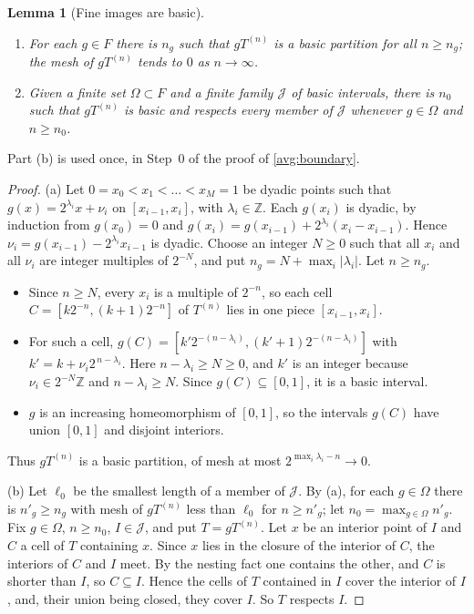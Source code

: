 \documentclass[11pt]{article}
\newcommand{\Z}{\mathbb Z}
\newtheorem{lemma}[theorem]{Lemma}
\theoremstyle{definition}
\numberwithin{equation}{section}
\begin{document}
\begin{lemma}[Fine images are basic]\label{dyad:eventual}
\begin{enumerate}[label=(\alph*)]
\item For each \(g\in F\) there is \(n_g\) such that \(gT^{(n)}\) is a basic
partition for all \(n\ge n_g\); the mesh of \(gT^{(n)}\) tends to \(0\) as
\(n\to\infty\).
\item Given a finite set \(\Omega\subset F\) and a finite family
\(\mathcal J\) of basic intervals, there is \(n_0\) such that \(gT^{(n)}\) is
basic and respects every member of \(\mathcal J\) whenever \(g\in\Omega\) and
\(n\ge n_0\).
\end{enumerate}
\end{lemma}
Part (b) is used once, in Step~0 of the proof of \cref{avg:boundary}.

\begin{proof}
(a) Let \(0=x_0<x_1<\dots<x_M=1\) be dyadic points such that
\(g(x)=2^{\lambda_i}x+\nu_i\) on \([x_{i-1},x_i]\), with \(\lambda_i\in\Z\).
Each \(g(x_i)\) is dyadic, by induction from \(g(x_0)=0\) and
\(g(x_i)=g(x_{i-1})+2^{\lambda_i}(x_i-x_{i-1})\). Hence
\(\nu_i=g(x_{i-1})-2^{\lambda_i}x_{i-1}\) is dyadic. Choose an integer
\(N\ge0\) such that all \(x_i\) and all \(\nu_i\) are integer multiples of
\(2^{-N}\), and put \(n_g=N+\max_i|\lambda_i|\). Let \(n\ge n_g\).
\begin{itemize}
\item Since \(n\ge N\), every \(x_i\) is a multiple of \(2^{-n}\), so each
cell \(C=[k2^{-n},(k+1)2^{-n}]\) of \(T^{(n)}\) lies in one piece
\([x_{i-1},x_i]\).
\item For such a cell,
\(g(C)=[k'2^{-(n-\lambda_i)},(k'+1)2^{-(n-\lambda_i)}]\) with
\(k'=k+\nu_i2^{\,n-\lambda_i}\). Here \(n-\lambda_i\ge N\ge0\), and \(k'\) is
an integer because \(\nu_i\in2^{-N}\Z\) and \(n-\lambda_i\ge N\). Since
\(g(C)\subseteq[0,1]\), it is a basic interval.
\item \(g\) is an increasing homeomorphism of \([0,1]\), so the intervals
\(g(C)\) have union \([0,1]\) and disjoint interiors.
\end{itemize}
Thus \(gT^{(n)}\) is a basic partition, of mesh at most
\(2^{\max_i\lambda_i-n}\to0\).

(b) Let \(\ell_0\) be the smallest length of a member of \(\mathcal J\). By
(a), for each \(g\in\Omega\) there is \(n'_g\ge n_g\) with mesh of
\(gT^{(n)}\) less than \(\ell_0\) for \(n\ge n'_g\); let
\(n_0=\max_{g\in\Omega}n'_g\). Fix \(g\in\Omega\), \(n\ge n_0\),
\(I\in\mathcal J\), and put \(T=gT^{(n)}\). Let \(x\) be an interior point of
\(I\) and \(C\) a cell of \(T\) containing \(x\). Since \(x\) lies in the
closure of the interior of \(C\), the interiors of \(C\) and \(I\) meet. By
the nesting fact one contains the other, and \(C\) is shorter than \(I\), so
\(C\subseteq I\). Hence the cells of \(T\) contained in \(I\) cover the
interior of \(I\), and, their union being closed, they cover \(I\). So \(T\)
respects \(I\).
\end{proof}
\end{document}
